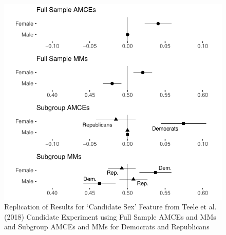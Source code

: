 \documentclass[a4paper,12pt]{article}\usepackage[]{graphicx}\usepackage[]{color}
\makeatletter
\def\maxwidth{ %
  \ifdim\Gin@nat@width>\linewidth
    \linewidth
  \else
    \Gin@nat@width
  \fi
}
\newenvironment{knitrout}{}{} %
\makeatother
\begin{document}
\begin{knitrout}
\color{fgcolor}\begin{figure}
\includegraphics[width=\maxwidth]{figure/tkr_replication-1} \caption[Replication of Results for `Candidate Sex' Feature from Teele et al]{Replication of Results for `Candidate Sex' Feature from Teele et al. (2018) Candidate Experiment using Full Sample AMCEs and MMs and Subgroup AMCEs and MMs for Democrats and Republicans}\label{fig:tkr_replication}
\end{figure}


\end{knitrout}
\end{document}
